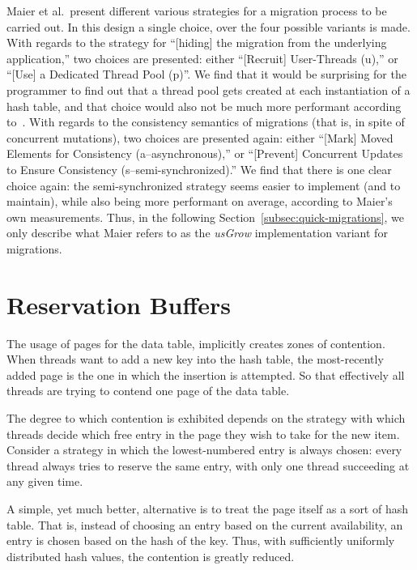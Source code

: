 Maier et al.\ present different various strategies for a migration process to be carried out.
In this design a single choice, over the four possible variants is made.
With regards to the strategy for ``[hiding] the migration from the underlying application,'' two choices are presented: either ``[Recruit] User-Threads (u),'' or ``[Use] a Dedicated Thread Pool (p)''.
We find that it would be surprising for the programmer to find out that a thread pool gets created at each instantiation of a hash table, and that choice would also not be much more performant according to~\cite[\S8.4, Using Dedicated Growing Threads]{maier}.
With regards to the consistency semantics of migrations (that is, in spite of concurrent mutations), two choices are presented again: either ``[Mark] Moved Elements for Consistency (a--asynchronous),'' or ``[Prevent] Concurrent Updates to Ensure Consistency (s--semi-synchronized).''
We find that there is one clear choice again: the semi-synchronized strategy seems easier to implement (and to maintain), while also being more performant on average, according to Maier's own measurements.
Thus, in the following Section~\ref{subsec:quick-migrations}, we only describe what Maier refers to as the \emph{usGrow} implementation variant for migrations.


\section{Reservation Buffers}\label{sec:reservation-buffers}

The usage of pages for the data table, implicitly creates zones of contention.
When threads want to add a new key into the hash table, the most-recently added page is the one in which the insertion is attempted.
So that effectively all threads are trying to contend one page of the data table.

The degree to which contention is exhibited depends on the strategy with which threads decide which free entry in the page they wish to take for the new item.
Consider a strategy in which the lowest-numbered entry is always chosen: every thread always tries to reserve the same entry, with only one thread succeeding at any given time.

A simple, yet much better, alternative is to treat the page itself as a sort of hash table.
That is, instead of choosing an entry based on the current availability, an entry is chosen based on the hash of the key.
Thus, with sufficiently uniformly distributed hash values, the contention is greatly reduced.

